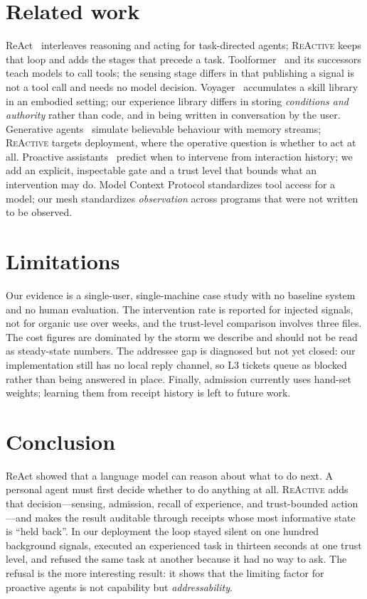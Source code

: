 \documentclass[10pt,a4paper]{article}
\newcommand{\sys}{\textsc{ReActive}}
\begin{document}
\section{Related work}

ReAct~\cite{react} interleaves reasoning and acting for task-directed
agents; \sys{} keeps that loop and adds the stages that precede a task.
Toolformer~\cite{toolformer} and its successors teach models to call tools;
the sensing stage differs in that publishing a signal is not a tool call and
needs no model decision. Voyager~\cite{voyager} accumulates a skill library
in an embodied setting; our experience library differs in storing
\emph{conditions and authority} rather than code, and in being written in
conversation by the user. Generative agents~\cite{genagents} simulate
believable behaviour with memory streams; \sys{} targets deployment, where
the operative question is whether to act at all. Proactive
assistants~\cite{proactive} predict when to intervene from interaction
history; we add an explicit, inspectable gate and a trust level that bounds
what an intervention may do. Model Context Protocol standardizes tool
access for a model; our mesh standardizes \emph{observation} across programs
that were not written to be observed.

\section{Limitations}

Our evidence is a single-user, single-machine case study with no baseline
system and no human evaluation. The intervention rate is reported for
injected signals, not for organic use over weeks, and the trust-level
comparison involves three files. The cost figures are dominated by the storm
we describe and should not be read as steady-state numbers. The addressee gap
is diagnosed but not yet closed: our implementation still has no local reply
channel, so L3 tickets queue as blocked rather than being answered in place.
Finally, admission currently uses hand-set weights; learning them from
receipt history is left to future work.

\section{Conclusion}

ReAct showed that a language model can reason about what to do next. A
personal agent must first decide whether to do anything at all. \sys{} adds
that decision---sensing, admission, recall of experience, and trust-bounded
action---and makes the result auditable through receipts whose most
informative state is ``held back''. In our deployment the loop stayed silent
on one hundred background signals, executed an experienced task in thirteen
seconds at one trust level, and refused the same task at another because it
had no way to ask. The refusal is the more interesting result: it shows that
the limiting factor for proactive agents is not capability but
\emph{addressability}.
\end{document}
